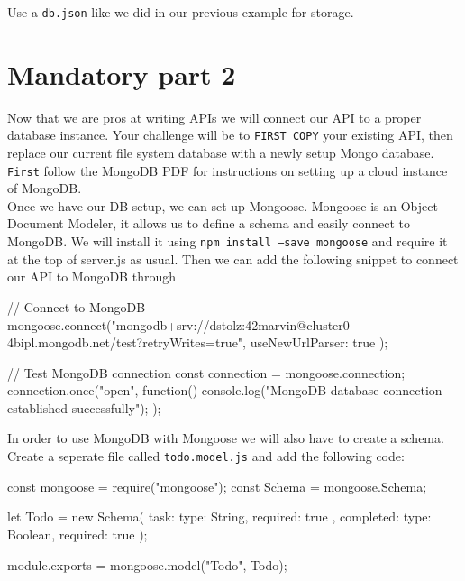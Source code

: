 \documentclass{42-en}
\begin{document}
Use a \texttt{db.json} like we did in our previous example for storage.

\newpage

\chapter{Mandatory part 2}

Now that we are pros at writing APIs we will connect our API to a proper database instance. Your challenge will be to \texttt{FIRST COPY} your existing API, then replace our current file system database with a newly setup Mongo database.\\

\texttt{First} follow the MongoDB PDF for instructions on setting up a cloud instance of MongoDB.\\
    Once we have our DB setup, we can set up Mongoose. Mongoose is an Object Document Modeler, it allows us to define a schema and easily connect to MongoDB. We will install it using \texttt{npm install --save mongoose} and require it at the top of server.js as usual. Then we can add the following snippet to connect our API to MongoDB through 

\begin{42jscode}
	// Connect to MongoDB
	mongoose.connect("mongodb+srv://dstolz:42marvin@cluster0-4bipl.mongodb.net/test?retryWrites=true",
	{ useNewUrlParser: true }
	);
	
	// Test MongoDB connection
	const connection = mongoose.connection;
	connection.once("open", function() {
		console.log("MongoDB database connection established successfully");
	});
	\end{42jscode}
	
	In order to use MongoDB with Mongoose we will also have to create a schema. Create a seperate file called \texttt{todo.model.js} and add the following code:
	
	\begin{42jscode}
        const mongoose = require("mongoose");
        const Schema = mongoose.Schema;

        let Todo = new Schema({
            task: { type: String, required: true },
            completed: { type: Boolean, required: true }
        });
                    
        module.exports = mongoose.model("Todo", Todo);
    \end{42jscode}
    
\end{document}
